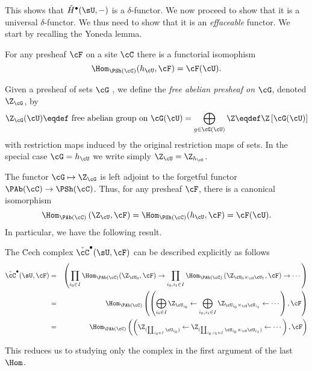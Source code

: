 This shows that $\check{H}^\bullet(\sU, -)$ is a $\delta$-functor. 
We now proceed to show that it is a universal $\delta$-functor. We thus need to show that it is an \emph{effaceable} functor. We start by recalling the Yoneda lemma.
  
  \begin{lem}
    For any presheaf $\cF$ on a site $\cC$ there is a functorial isomophism
      $$
        \Hom_{\PSh(\cC)} (h_{\cU}, \cF) = \cF(\cU).
$$
  \end{lem}
  
  \begin{defi}
  Given a presheaf of sets $\cG$ , we define the \emph{free abelian presheaf on $\cG$}, denoted $\Z_{\cG}$, by
$$
    \Z_{\cG}(\cU) \eqdef \text{ free abelian group on }\cG(\cU) = \bigoplus_{g\in \cG(\cU)}\Z  \eqdef \Z\left[\cG(\cU)\right]
  $$
  with restriction maps induced by the original restriction maps of sets. In the special case $\cG = h_\cU$ we write simply $\Z_\cU = \Z_{h_\cU}$.
  \end{defi}
  
  The functor $\cG \mapsto \Z_\cG$ is left adjoint to the forgetful
  functor $\PAb(\cC) \to \PSh(\cC)$.  Thus, for any presheaf $\cF$, there is a canonical isomorphism
 $$
    \Hom_{\PAb(\cC)}\left(\Z_\cU, \cF\right)=
    \Hom_{\PSh(\cC)}(h_\cU, \cF) = \cF(\cU).
$$
  In particular, we have the following result.
  
  \begin{lem}
  The \u Cech complex $\check{\cC}^\bullet(\sU, \cF)$ can be described explicitly as follows
\begin{eqnarray*}
   \check{\cC}^\bullet(\sU, \cF)  
   & = &
   \left(\prod_{i_0\in I}\Hom_{\PAb(\cC)}(\Z_{\cU_0}, \cF)\to \prod_{i_0, i_1 \in I} \Hom_{\PAb(\cC)}\left(\Z_{\cU_0\times_\cU \cU_1}, \cF\right) \to \cdots\right)\\ 
   & = & \Hom_{\PAb(\cC)} \left(\left(\displaystyle \bigoplus_{i_0\in I} \Z_{\cU_{i_0}}\leftarrow \bigoplus_{i_0, i_1\in I} \Z_{\cU_{i_0}\times_\cU \cU_{i_1}} \leftarrow \cdots\right), \cF\right) \\ 
   & = & \Hom_{\PAb(\cC)}\left(\left(\Z_{(\coprod_{i_0\in I} \cU_{i_0})}\leftarrow \Z_{(\coprod_{i_0, i_1\in I} \cU_{i_0}\times_\cU \cU_{i_1})}\leftarrow \cdots\right),\cF\right) 
\end{eqnarray*}
  \end{lem}
  
  This reduces us to studying only the complex in the first argument of the last $\Hom$.
  
